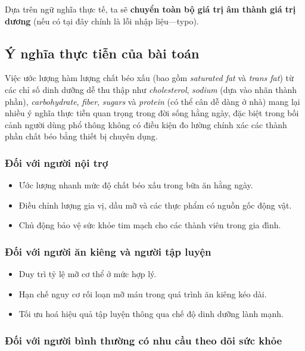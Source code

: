 \documentclass[12pt,a4paper]{article}
\begin{document}
Dựa trên ngữ nghĩa thực tế, ta sẽ \textbf{chuyển toàn bộ giá trị âm thành giá trị dương} (nếu có tại đây chính là lỗi nhập liệu—typo).

\subsection{Ý nghĩa thực tiễn của bài toán}

Việc ước lượng hàm lượng chất béo xấu (bao gồm \textit{saturated fat} và \textit{trans fat}) từ các chỉ số dinh dưỡng dễ thu thập như \textit{cholesterol}, \textit{sodium} (dựa vào nhãn thành phần), \textit{carbohydrate}, \textit{fiber}, \textit{sugars} và \textit{protein} (có thể cân dễ dàng ở nhà) mang lại nhiều ý nghĩa thực tiễn quan trọng trong đời sống hằng ngày, đặc biệt trong bối cảnh người dùng phổ thông không có điều kiện đo lường chính xác các thành phần chất béo bằng thiết bị chuyên dụng.

\subsubsection{Đối với người nội trợ}

\begin{itemize}
    \item Ước lượng nhanh mức độ chất béo xấu trong bữa ăn hằng ngày.
    \item Điều chỉnh lượng gia vị, dầu mỡ và các thực phẩm có nguồn gốc động vật.
    \item Chủ động bảo vệ sức khỏe tim mạch cho các thành viên trong gia đình.
\end{itemize}

\subsubsection{Đối với người ăn kiêng và người tập luyện}

\begin{itemize}
    \item Duy trì tỷ lệ mỡ cơ thể ở mức hợp lý.
    \item Hạn chế nguy cơ rối loạn mỡ máu trong quá trình ăn kiêng kéo dài.
    \item Tối ưu hoá hiệu quả tập luyện thông qua chế độ dinh dưỡng lành mạnh.
\end{itemize}

\subsubsection{Đối với người bình thường có nhu cầu theo dõi sức khỏe}
\end{document}
